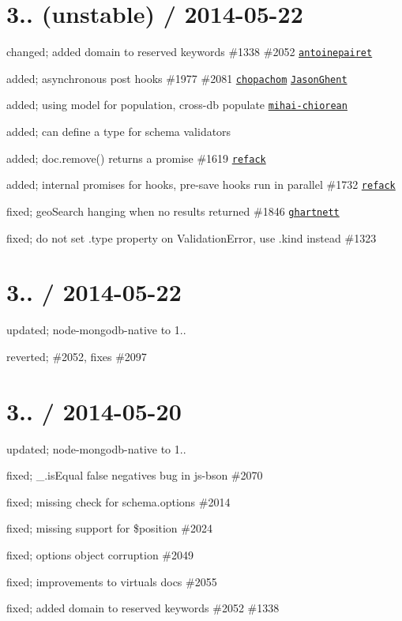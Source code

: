 \section*{3.. (unstable) / 2014-\/05-\/22 }


\begin{DoxyItemize}
\item changed; added {\ttfamily domain} to reserved keywords \#1338 \#2052 \href{https://github.com/antoinepairet}{\tt antoinepairet}
\item added; asynchronous post hooks \#1977 \#2081 \href{https://github.com/chopachom}{\tt chopachom} \href{https://github.com/JasonGhent}{\tt Jason\+Ghent}
\item added; using model for population, cross-\/db populate \href{https://github.com/mihai-chiorean}{\tt mihai-\/chiorean}
\item added; can define a type for schema validators
\item added; {\ttfamily doc.\+remove()} returns a promise \#1619 \href{https://github.com/refack}{\tt refack}
\item added; internal promises for hooks, pre-\/save hooks run in parallel \#1732 \href{https://github.com/refack}{\tt refack}
\item fixed; geo\+Search hanging when no results returned \#1846 \href{https://github.com/ghartnett}{\tt ghartnett}
\item fixed; do not set .type property on Validation\+Error, use .kind instead \#1323
\end{DoxyItemize}

\section*{3.. / 2014-\/05-\/22 }


\begin{DoxyItemize}
\item updated; node-\/mongodb-\/native to 1..
\item reverted; \#2052, fixes \#2097
\end{DoxyItemize}

\section*{3.. / 2014-\/05-\/20 }


\begin{DoxyItemize}
\item updated; node-\/mongodb-\/native to 1..
\item fixed; \+\_\+.\+is\+Equal false negatives bug in js-\/bson \#2070
\item fixed; missing check for schema.\+options \#2014
\item fixed; missing support for \$position \#2024
\item fixed; options object corruption \#2049
\item fixed; improvements to virtuals docs \#2055
\item fixed; added {\ttfamily domain} to reserved keywords \#2052 \#1338
\end{DoxyItemize}

